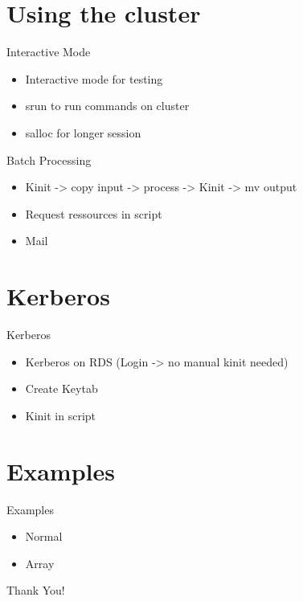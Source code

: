\documentclass{beamer}
\begin{document}
\section{Using the cluster}
\begin{frame}{Interactive Mode}
	\begin{itemize}
		\item Interactive mode for testing
		\item srun to run commands on cluster
		\item salloc for longer session
	\end{itemize}
\end{frame}



\begin{frame}{Batch Processing}
	\begin{itemize}
		\item Kinit -> copy input -> process -> Kinit -> mv output
		\item Request ressources in script
		\item Mail
	\end{itemize}
\end{frame}

\section{Kerberos}
\begin{frame}{Kerberos}
	\begin{itemize}
		\item Kerberos on RDS (Login -> no manual kinit needed)
		\item Create Keytab
		\item Kinit in script
	\end{itemize}
\end{frame}

\section{Examples}
\begin{frame}{Examples}
	\begin{itemize}
		\item Normal
		\item Array
	\end{itemize}
\end{frame}
\begin{frame}
    \centering \Large
    Thank You!
\end{frame}
\end{document}
